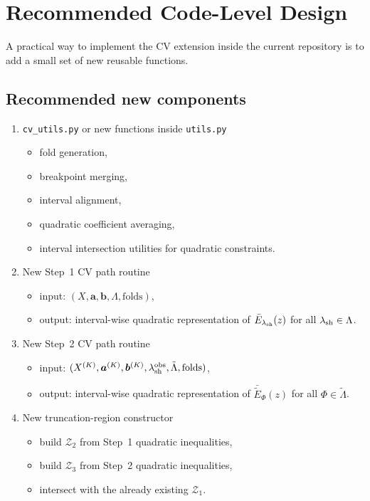 \documentclass[11pt]{article}
\begin{document}
\section{Recommended Code-Level Design}
A practical way to implement the CV extension inside the current repository is to add a small set of new reusable functions.

\subsection{Recommended new components}
\begin{enumerate}[leftmargin=2em]
    \item \texttt{cv\_utils.py} or new functions inside \texttt{utils.py}
    \begin{itemize}[leftmargin=2em]
        \item fold generation,
        \item breakpoint merging,
        \item interval alignment,
        \item quadratic coefficient averaging,
        \item interval intersection utilities for quadratic constraints.
    \end{itemize}

    \item New Step~1 CV path routine
    \begin{itemize}[leftmargin=2em]
        \item input: $(X, \bm a, \bm b, \Lambda, \text{folds})$,
        \item output: interval-wise quadratic representation of $\bar{E}_{\lambda_{\rm sh}}(z)$ for all $\lambda_{\rm sh} \in \Lambda$.
    \end{itemize}

    \item New Step~2 CV path routine
    \begin{itemize}[leftmargin=2em]
        \item input: $(X^{(K)}, \bm a^{(K)}, \bm b^{(K)}, \lambda_{\rm sh}^{\rm obs}, \tilde{\Lambda}, \text{folds})$,
        \item output: interval-wise quadratic representation of $\bar{\tilde{E}}_{\Phi}(z)$ for all $\Phi \in \tilde{\Lambda}$.
    \end{itemize}

    \item New truncation-region constructor
    \begin{itemize}[leftmargin=2em]
        \item build $\mathcal{Z}_2$ from Step~1 quadratic inequalities,
        \item build $\mathcal{Z}_3$ from Step~2 quadratic inequalities,
        \item intersect with the already existing $\mathcal{Z}_1$.
    \end{itemize}


\end{enumerate}
\end{document}
